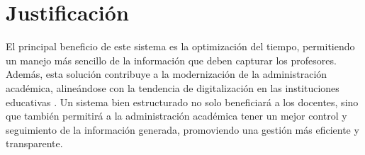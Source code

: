 \section{Justificación}\label{sec:justificacion}
\justifying

El principal beneficio de este sistema es la optimización del tiempo, permitiendo un manejo más sencillo de la información que deben capturar los profesores.
Además, esta solución contribuye a la modernización de la administración académica, alineándose con la tendencia de digitalización en las instituciones educativas \cite{martinez2024digitalizacion}. Un sistema bien estructurado no solo beneficiará a los docentes, sino que también permitirá a la administración académica tener un mejor control y seguimiento de la información generada, promoviendo una gestión más eficiente y transparente.

\newpage
